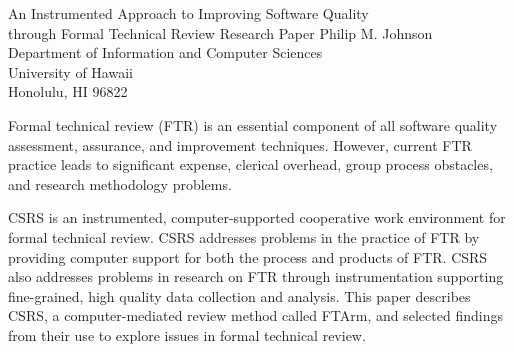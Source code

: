 
\pagestyle{empty}




\makeieeetitle
  {An Instrumented Approach to Improving Software Quality\\
   through Formal Technical Review}
  {Research Paper}
  {Philip M. Johnson\\
   Department of Information and Computer Sciences\\
   University of Hawaii\\
   Honolulu, HI 96822}

   
   \makeieeeabstract 
   {
   Formal technical review (FTR) is an essential
   component of all software quality assessment, assurance, and
   improvement techniques.  However, current FTR practice leads to
   significant expense, clerical overhead, group process obstacles, and
   research methodology problems.
  
   CSRS is an instrumented, computer-supported cooperative work
   environment for formal technical review.  CSRS addresses problems in
   the practice of FTR by providing computer support for both the
   process and products of FTR.  CSRS also addresses problems in
   research on FTR through instrumentation supporting fine-grained, high
   quality data collection and analysis.  This paper describes CSRS, a
   computer-mediated review method called FTArm, and selected findings
   from their use to explore issues in formal technical review.  }












     
